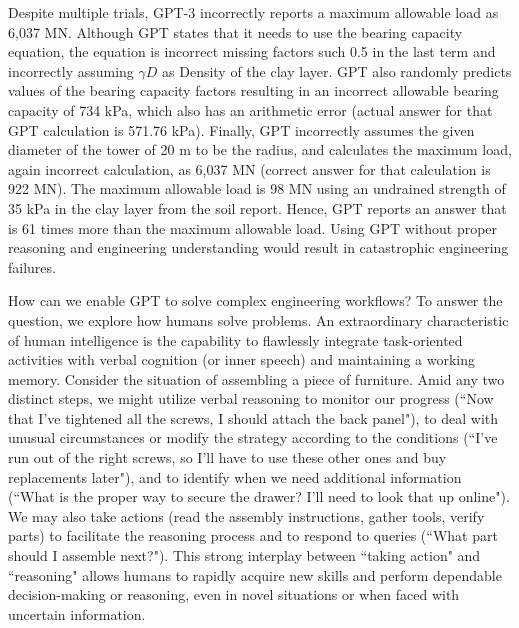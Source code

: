 \documentclass{article}
\begin{document}
Despite multiple trials, GPT-3 incorrectly reports a maximum allowable load as 6,037 MN. Although GPT states that it needs to use the bearing capacity equation, the equation is incorrect missing factors such 0.5 in the last term and incorrectly assuming $\gamma D$ as Density of the clay layer. GPT also randomly predicts values of the bearing capacity factors resulting in an incorrect allowable bearing capacity of 734 kPa, which also has an arithmetic error (actual answer for that GPT calculation is 571.76 kPa). Finally, GPT incorrectly assumes the given diameter of the tower of 20 m to be the radius, and calculates the maximum load, again incorrect calculation, as 6,037 MN (correct answer for that calculation is 922 MN). The maximum allowable load is 98 MN using an undrained strength of 35 kPa in the clay layer from the soil report. Hence, GPT reports an answer that is 61 times more than the maximum allowable load. Using GPT without proper reasoning and engineering understanding would result in catastrophic engineering failures. 

How can we enable GPT to solve complex engineering workflows? To answer the question, we explore how humans solve problems. An extraordinary characteristic of human intelligence is the capability to flawlessly integrate task-oriented activities with verbal cognition (or inner speech) and maintaining a working memory. Consider the situation of assembling a piece of furniture. Amid any two distinct steps, we might utilize verbal reasoning to monitor our progress (``Now that I've tightened all the screws, I should attach the back panel"), to deal with unusual circumstances or modify the strategy according to the conditions (``I've run out of the right screws, so I'll have to use these other ones and buy replacements later"), and to identify when we need additional information (``What is the proper way to secure the drawer? I'll need to look that up online"). We may also take actions (read the assembly instructions, gather tools, verify parts) to facilitate the reasoning process and to respond to queries (``What part should I assemble next?"). This strong interplay between ``taking action" and ``reasoning" allows humans to rapidly acquire new skills and perform dependable decision-making or reasoning, even in novel situations or when faced with uncertain information.
\end{document}
